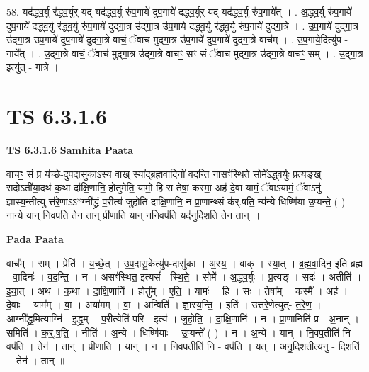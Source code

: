 \documentclass[17pt]{extarticle}
\begin{document}
58. यद॑द्ध्व॒र्यु र॑द्ध्व॒र्युर् यद् यद॑द्ध्व॒र्यु रु॑प॒गाये॑ दुप॒गाये॑ दद्ध्व॒र्युर् यद् यद॑द्ध्व॒र्यु रु॑प॒गाये᳚त् । . अ॒द्ध्व॒र्यु रु॑प॒गाये॑ दुप॒गाये॑ दद्ध्व॒र्यु र॑द्ध्व॒र्यु रु॑प॒गाये॑ दुद्‍गा॒त्र उ॑द्‍गा॒त्र उ॑प॒गाये॑ दद्ध्व॒र्यु र॑द्ध्व॒र्यु रु॑प॒गाये॑ दुद्‍गा॒त्रे । . उ॒प॒गाये॑ दुद्‍गा॒त्र उ॑द्‍गा॒त्र उ॑प॒गाये॑ दुप॒गाये॑ दुद्‍गा॒त्रे वाचं॒ ॅवाच॑ मुद्‍गा॒त्र उ॑प॒गाये॑ दुप॒गाये॑ दुद्‍गा॒त्रे वाच᳚म् । . उ॒प॒गाये॒दित्यु॑प - गाये᳚त् । . उ॒द्‍गा॒त्रे वाचं॒ ॅवाच॑ मुद्‍गा॒त्र उ॑द्‍गा॒त्रे वाचꣳ॒॒ सꣳ सं ॅवाच॑ मुद्‍गा॒त्र उ॑द्‍गा॒त्रे वाचꣳ॒॒ सम् । . उ॒द्‍गा॒त्र इत्यु॑त् - गा॒त्रे । \newline
\pagebreak
{}

\section{ TS 6.3.1.6 }

\textbf{TS 6.3.1.6 } \newline
\textbf{Samhita Paata} \newline

वाचꣳ॒॒ सं प्र य॑च्छे-दुप॒दासु॑काऽस्य॒ वाख् स्या᳚द्ब्रह्मवा॒दिनो॑ वदन्ति॒ नासꣳ॑स्थिते॒ सोमे᳚ऽद्ध्व॒र्युः प्र॒त्यङ्ख् सदोऽती॑या॒दथ॑ क॒था दा᳚क्षि॒णानि॒ होतु॑मेति॒ यामो॒ हि स तेषां॒ कस्मा॒ अह॑ दे॒वा यामं॒ ॅवाऽया॑मं॒ ॅवाऽनु॑ ज्ञास्य॒न्तीत्यु-त्त॑रे॒णाऽऽ*ग्नी᳚द्ध्रं प॒रीत्य॑ जुहोति दाक्षि॒णानि॒ न प्रा॒णान्थ्सं क॑र्.षति॒ न्य॑न्ये धिष्णि॑या उ॒प्यन्ते॒ ( ) नान्ये यान् नि॒वप॑ति॒ तेन॒ तान् प्री॑णाति॒ यान् ननि॒वप॑ति॒ यद॑नुदि॒शति॒ तेन॒ तान् ॥ \newline

\textbf{Pada Paata} \newline

वाच᳚म् । सम् । प्रेति॑ । य॒च्छे॒त् । उ॒प॒दासु॒केत्यु॑प-दासु॑का । अ॒स्य॒ । वाक् । स्या॒त् । ब्र॒ह्म॒वा॒दिन॒ इति॑ ब्रह्म - वा॒दिनः॑ । व॒द॒न्ति॒ । न । असꣳ॑स्थित॒ इत्यसं᳚ - स्थि॒ते॒ । सोमे᳚ । अ॒द्ध्व॒र्युः । प्र॒त्यङ् । सदः॑ । अतीति॑ । इ॒या॒त् । अथ॑ । क॒था । दा॒क्षि॒णानि॑ । होतु᳚म् । ए॒ति॒ । यामः॑ । हि । सः । तेषा᳚म् । कस्मै᳚ । अह॑ । दे॒वाः । याम᳚म् । वा॒ । अया॑मम् । वा॒ । अन्विति॑ । ज्ञा॒स्य॒न्ति॒ । इति॑ । उत्त॑रे॒णेत्युत्- त॒रे॒ण॒ । आग्नी᳚द्ध्र॒मित्याग्नि॑ - इ॒द्ध्र॒म् । प॒रीत्येति॑ परि - इत्य॑ । जु॒हो॒ति॒ । दा॒क्षि॒णानि॑ । न । प्रा॒णानिति॑ प्र - अ॒नान् । समिति॑ । क॒र्॒.ष॒ति॒ । नीति॑ । अ॒न्ये । धिष्णि॑याः । उ॒प्यन्ते᳚ ( ) । न । अ॒न्ये । यान् । नि॒वप॒तीति॑ नि - वप॑ति । तेन॑ । तान् । प्री॒णा॒ति॒ । यान् । न । नि॒वप॒तीति॑ नि - वप॑ति । यत् । अ॒नु॒दि॒शतीत्य॑नु - दि॒शति॑ । तेन॑ । तान् ॥  \newline
\end{document}
